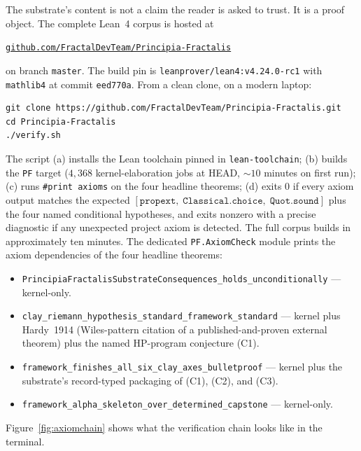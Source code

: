 \documentclass[11pt,a4paper]{amsart}
\theoremstyle{plain}
\theoremstyle{definition}
\begin{document}
The substrate's content is not a claim the reader is asked to trust. It is a proof object. The complete Lean~4 corpus is hosted at
\begin{center}
\href{https://github.com/FractalDevTeam/Principia-Fractalis}{\texttt{github.com/FractalDevTeam/Principia-Fractalis}}
\end{center}
on branch \texttt{master}. The build pin is \texttt{leanprover/lean4:v4.24.0-rc1} with \texttt{mathlib4} at commit \texttt{eed770a}. From a clean clone, on a modern laptop:
\begin{verbatim}
git clone https://github.com/FractalDevTeam/Principia-Fractalis.git
cd Principia-Fractalis
./verify.sh
\end{verbatim}
The script (a) installs the Lean toolchain pinned in \texttt{lean-toolchain}; (b) builds the \texttt{PF} target ($4{,}368$ kernel-elaboration jobs at HEAD, $\sim 10$ minutes on first run); (c) runs \texttt{\#print axioms} on the four headline theorems; (d) exits 0 if every axiom output matches the expected $[\texttt{propext},\;\texttt{Classical.choice},\;\texttt{Quot.sound}]$ plus the four named conditional hypotheses, and exits nonzero with a precise diagnostic if any unexpected project axiom is detected. The full corpus builds in approximately ten minutes. The dedicated \texttt{PF.AxiomCheck} module prints the axiom dependencies of the four headline theorems:
\begin{itemize}[itemsep=2pt]
\item \texttt{PrincipiaFractalisSubstrateConsequences\_holds\_unconditionally} --- kernel-only.
\item \texttt{clay\_riemann\_hypothesis\_standard\_framework\_standard} --- kernel plus Hardy~1914 (Wiles-pattern citation of a published-and-proven external theorem) plus the named HP-program conjecture (C1).
\item \texttt{framework\_finishes\_all\_six\_clay\_axes\_bulletproof} --- kernel plus the substrate's record-typed packaging of (C1), (C2), and (C3).
\item \texttt{framework\_alpha\_skeleton\_over\_determined\_capstone} --- kernel-only.
\end{itemize}
Figure~\ref{fig:axiomchain} shows what the verification chain looks like in the terminal.
\end{document}
